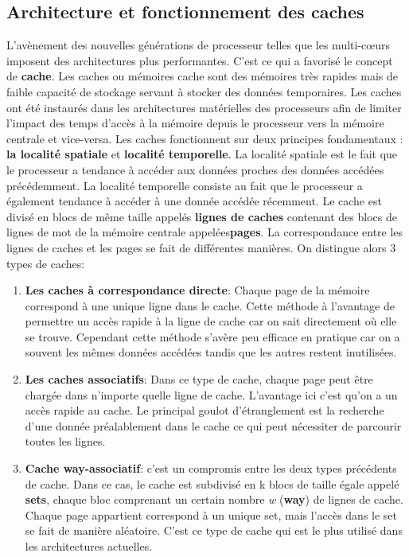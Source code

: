 \subsection{Architecture et fonctionnement des caches}   
L’avènement des nouvelles générations de processeur telles que les multi-cœurs imposent des architectures plus performantes. C’est ce qui a favorisé le concept de \textbf{cache}. Les caches ou mémoires cache sont des mémoires très rapides mais de faible capacité de stockage servant à  stocker des données temporaires. Les caches ont été instaurés dans les architectures matérielles  des processeurs afin de limiter l’impact des temps d’accès à la mémoire depuis le processeur vers la mémoire centrale et vice-versa. Les caches fonctionnent sur deux principes fondamentaux : \textbf{la localité spatiale} et \textbf{ localité temporelle}. La localité spatiale est le fait que le processeur a tendance à accéder aux données proches des données accédées précédemment. La localité temporelle consiste au fait que le processeur a également tendance à accéder à une donnée accédée récemment. Le cache est divisé en blocs de même taille appelés \textbf{lignes de caches} contenant des blocs de  lignes de mot de la mémoire centrale appelées\textbf{pages}. La correspondance entre les lignes de caches et les pages se fait de différentes manières. On distingue alors 3 types de caches: 
\begin{enumerate}
 \item  \textbf{Les caches à  correspondance directe}: Chaque page de la mémoire correspond à une unique ligne dans le cache. Cette méthode à l’avantage de permettre un accès rapide à la ligne de cache  car on sait directement où elle se trouve. Cependant cette méthode s’avère peu efficace en pratique car on a souvent les mêmes données accédées tandis que les autres restent inutilisées.
 \item  \textbf{Les caches associatifs}: Dans ce type de cache, chaque page peut être chargée dans n’importe quelle ligne de cache. L’avantage ici c’est qu’on a un accès rapide au cache. Le principal goulot d’étranglement est la recherche d’une donnée préalablement dans le cache ce qui peut nécessiter de parcourir toutes les lignes.
 \item  \textbf{Cache way-associatif}: c’est un compromis entre les deux types précédents de cache. Dans ce cas, le cache est subdivisé en k blocs de taille égale appelé \textbf{sets}, chaque bloc comprenant un certain nombre \textit{w} (\textbf{way}) de lignes de cache. Chaque  page appartient correspond à un unique set, mais l’accès dans le set  se fait de manière aléatoire. C’est ce type de cache qui est le plus utilisé dans les architectures actuelles.
\end{enumerate}
\par

